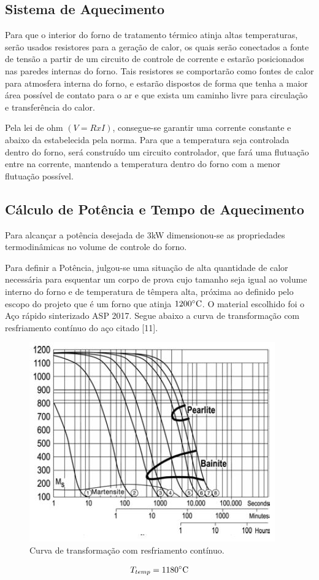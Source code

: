 \subsection{Sistema de Aquecimento}
Para que o interior do forno de tratamento térmico atinja altas temperaturas, serão usados resistores para a geração de calor, os quais serão conectados a fonte de tensão a partir de um circuito de controle de corrente e estarão posicionados nas paredes internas do forno. Tais resistores se comportarão como fontes de calor para atmosfera interna do forno, e estarão dispostos de forma que tenha a maior área possível de contato para o ar e que exista um caminho livre para circulação e transferência do calor.

Pela lei de ohm $(V=R x I)$, consegue-se garantir uma corrente constante e abaixo da estabelecida pela norma. Para que a temperatura seja controlada dentro do forno, será construído um circuito controlador, que fará uma flutuação entre na corrente, mantendo a temperatura dentro do forno com a menor flutuação possível.

\subsection{Cálculo de Potência e Tempo de Aquecimento}
Para alcançar a potência desejada de 3kW dimensionou-se as propriedades termodinâmicas no volume de controle do forno.

Para definir a Potência, julgou-se uma situação de alta quantidade de calor necessária para esquentar um corpo de prova cujo tamanho seja igual ao volume interno do forno e de temperatura de têmpera alta, próxima ao definido pelo escopo do projeto que é um forno que atinja $1200 \degree \text{C}$. O material escolhido foi o Aço rápido sinterizado ASP 2017. Segue abaixo a curva de transformação com resfriamento contínuo do aço citado [11].
\begin{figure}[H]
	\centering
	\label{transf_continuo}
	\includegraphics[keepaspectratio=true,scale=0.8]{figuras/transf_continuo.JPG}
	\caption{Curva de transformação com resfriamento contínuo.}
\end{figure}
\begin{gather}
	T_{temp} = 1180 \degree \text{C}
\end{gather}

